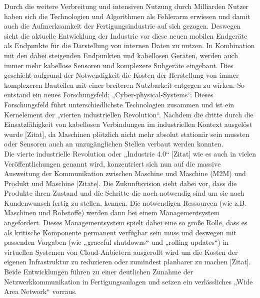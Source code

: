 Durch die weitere Verbreitung und intensiven Nutzung durch Milliarden Nutzer haben sich die Technologien und Algorithmen als Fehlerarm erwiesen und damit auch die Aufmerksamkeit der Fertigungsindustrie auf sich gezogen. Deswegen sieht die aktuelle Entwicklung der Industrie vor diese neuen mobilen Endgeräte als Endpunkte für die Darstellung von internen Daten zu nutzen. In Kombination mit den dabei steigenden Endpunkten und kabellosen Geräten, werden auch immer mehr kabellose Sensoren und komplexere Subgeräte eingebaut. Dies geschieht aufgrund der Notwendigkeit die Kosten der Herstellung von immer komplexeren Bauteilen mit einer breiteren Nutzbarkeit entgegen zu wirken. So entstand ein neues Forschungsfeld: „Cyber-physical-Systems“. Dieses Forschungsfeld führt unterschiedlichste Technologien zusammen und ist ein Kernelement der „vierten industriellen Revolution“. Nachdem die dritte durch die Einsatzfähigkeit von kabellosen Verbindungen im industriellen Kontext ausgelöst wurde [Zitat], da Maschinen plötzlich nicht mehr absolut stationär sein mussten oder Sensoren auch an unzugänglichen Stellen verbaut werden konnten.\\
Die vierte industrielle Revolution oder „Industrie 4.0“ [Zitat] wie es auch in vielen Veröffentlichungen genannt wird, konzentriert sich nun auf die massive Ausweitung der Kommunikation zwischen Maschine und Maschine (M2M) und Produkt und Maschine [Zitate]. Die Zukunftsvision sieht dabei vor, dass die Produkte ihren Zustand und die Schritte die noch notwendig sind um sie nach Kundenwunsch fertig zu stellen, kennen. Die notwendigen Ressourcen (wie z.B. Maschinen und Rohstoffe) werden dann bei einem Managementsystem angefordert. Dieses Managementsystem spielt dabei eine so große Rolle, dass es als kritische Komponente permanent verfügbar sein muss und deswegen mit passenden Vorgaben (wie „graceful shutdowns“ und „rolling updates“) in virtuellen Systemen von Cloud-Anbietern ausgerollt wird  um die Kosten der eigenen Infrastruktur zu reduzieren oder zumindest planbarer zu machen [Zitat]. Beide Entwicklungen führen zu einer deutlichen Zunahme der Netzwerkkommunikation in Fertigungsanlagen und setzen ein verlässliches „Wide Area Network“ vorraus.\\
